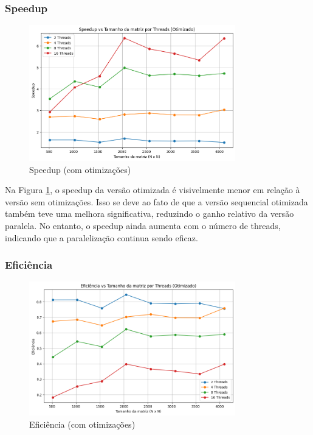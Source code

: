 \documentclass[12pt, a4paper]{article}
\begin{document}
	\subsubsection{Speedup}

	\begin{figure}[H]
		\centering
		\includegraphics[width=0.8\textwidth]{img/speedup-opt.png}
		\caption{Speedup (com otimizações)}
		\label{fig:speedup_otimizado}
	\end{figure}

	Na Figura \ref{fig:speedup_otimizado}, o speedup da versão otimizada é visivelmente menor em relação à versão sem otimizações.
	Isso se deve ao fato de que a versão sequencial otimizada também teve uma melhora significativa, reduzindo o ganho relativo da versão paralela.
	No entanto, o speedup ainda aumenta com o número de threads, indicando que a paralelização continua sendo eficaz.

	\subsubsection{Eficiência}

	\begin{figure}[H]
		\centering
		\includegraphics[width=0.8\textwidth]{img/efficiency-opt.png}
		\caption{Eficiência (com otimizações)}
		\label{fig:eficiencia_otimizado}
	\end{figure}
\end{document}
